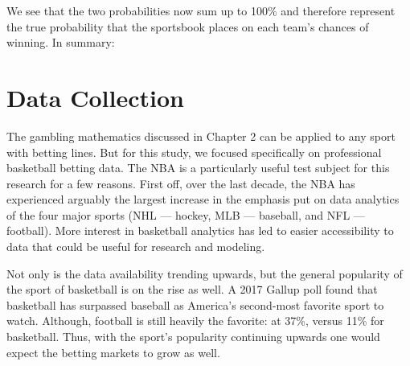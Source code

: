 \documentclass [MS] {uclathes}
\begin{document}
We see that the two probabilities now sum up to 100\% and therefore represent the true probability that the sportsbook places on each team's chances of winning. In summary: \\

\begin{table}[ht!]
\caption{Summary of betting values for sample wager}
\label{tab:bet-summary-table}
\end{table}


\chapter{Data Collection}

The gambling mathematics discussed in Chapter 2 can be applied to any sport with betting lines. But for this study, we focused specifically on professional basketball betting data. The NBA is a particularly useful test subject for this research for a few reasons. First off, over the last decade, the NBA has experienced arguably the largest increase in the emphasis put on data analytics of the four major sports (NHL --- hockey, MLB --- baseball, and NFL --- football). More interest in basketball analytics has led to easier accessibility to data that could be useful for research and modeling.

Not only is the data availability trending upwards, but the general popularity of the sport of basketball is on the rise as well. A 2017 Gallup poll found that basketball has surpassed baseball as America's second-most favorite sport to watch. Although, football is still heavily the favorite: at 37\%, versus 11\% for basketball. \cite{gallup} Thus, with the sport's popularity continuing upwards one would expect the betting markets to grow as well. 
\end{document}
